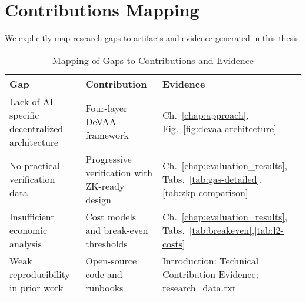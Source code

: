 \section{Contributions Mapping}

We explicitly map research gaps to artifacts and evidence generated in this thesis.
\begin{table}[h]
\centering
\caption{Mapping of Gaps to Contributions and Evidence}
\label{tab:contrib-mapping}
\begin{tabular}{p{3.5cm}p{6.5cm}p{5.5cm}}
\toprule
\textbf{Gap} & \textbf{Contribution} & \textbf{Evidence} \\
\midrule
Lack of AI-specific decentralized architecture & Four-layer DeVAA framework & Ch.~\ref{chap:approach}, Fig.~\ref{fig:devaa-architecture} \\
No practical verification data & Progressive verification with ZK-ready design & Ch.~\ref{chap:evaluation_results}, Tabs.~\ref{tab:gas-detailed},\ref{tab:zkp-comparison} \\
Insufficient economic analysis & Cost models and break-even thresholds & Ch.~\ref{chap:evaluation_results}, Tabs.~\ref{tab:breakeven},\ref{tab:l2-costs} \\
Weak reproducibility in prior work & Open-source code and runbooks & Introduction: Technical Contribution Evidence; research\_data.txt \\
\bottomrule
\end{tabular}
\end{table}